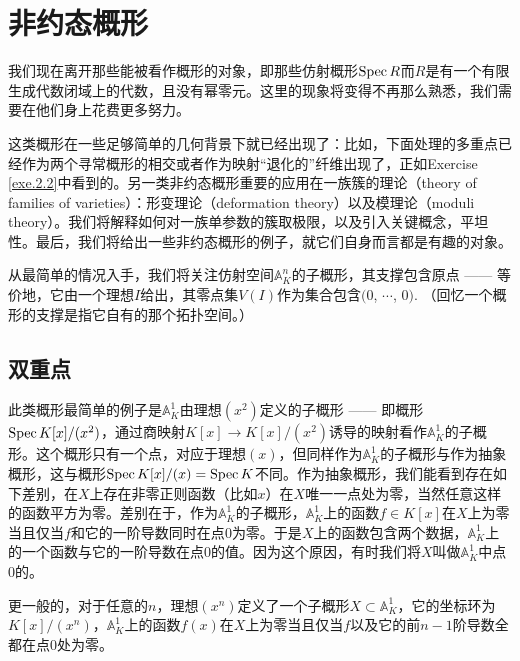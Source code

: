 \section{非约态概形}

我们现在离开那些能被看作概形的对象，即那些仿射概形$\operatorname{Spec} R$而$R$是有一个有限生成代数闭域上的代数，且没有幂零元。这里的现象将变得不再那么熟悉，我们需要在他们身上花费更多努力。

这类概形在一些足够简单的几何背景下就已经出现了：比如，下面处理的多重点已经作为两个寻常概形的相交或者作为映射“退化的”纤维出现了，正如Exercise \ref{exe.2.2}中看到的。另一类非约态概形重要的应用在一族簇的理论（theory of families of varieties）：形变理论（deformation theory）以及模理论（moduli theory）。我们将解释如何对一族单参数的簇取极限，以及引入关键概念，平坦性。最后，我们将给出一些非约态概形的例子，就它们自身而言都是有趣的对象。

从最简单的情况入手，我们将关注仿射空间$\mathbb{A}_K^n$的子概形，其支撑包含原点 ------ 等价地，它由一个理想$I$给出，其零点集$V(I)$作为集合包含$(0$, $\cdots$, $0)$. （回忆一个概形的支撑是指它自有的那个拓扑空间。）

\subsection{双重点}
\begin{exa}
	此类概形最简单的例子是$\mathbb{A}_K^1$由理想$(x^2)$定义的子概形 ------ 即概形$\operatorname{Spec} K[x]/(x^2)$，通过商映射$K[x]\to K[x]/(x^2)$诱导的映射看作$\mathbb{A}_K^1$的子概形。这个概形只有一个点，对应于理想$(x)$，但同样作为$\mathbb{A}_K^1$的子概形与作为抽象概形，这与概形$\operatorname{Spec} K[x]/(x)=\operatorname{Spec} K$不同。作为抽象概形，我们能看到存在如下差别，在$X$上存在非零正则函数（比如$x$）在$X$唯一一点处为零，当然任意这样的函数平方为零。差别在于，作为$\mathbb{A}_K^1$的子概形，$\mathbb{A}_K^1$上的函数$f\in K[x]$在$X$上为零当且仅当$f$和它的一阶导数同时在点$0$为零。于是$X$上的函数包含两个数据，$\mathbb{A}_K^1$上的一个函数与它的一阶导数在点$0$的值。因为这个原因，有时我们将$X$叫做$\mathbb{A}_K^1$中点$0$的。
\end{exa}

更一般的，对于任意的$n$，理想$(x^n)$定义了一个子概形$X\subset \mathbb{A}_K^1$，它的坐标环为$K[x]/(x^n)$，$\mathbb{A}_K^1$上的函数$f(x)$在$X$上为零当且仅当$f$以及它的前$n-1$阶导数全都在点$0$处为零。

